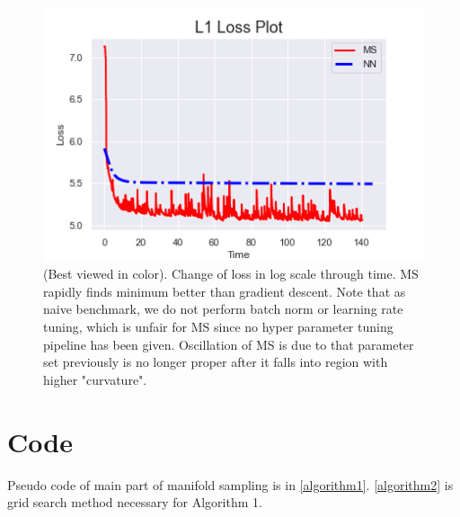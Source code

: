 \documentclass[10pt, oneside]{article}
\begin{document}
  
  \begin{figure}[H]
\centering
  \includegraphics[width=0.8\linewidth]{figure/loss.png}
   \caption{(Best viewed in color). Change of loss in log scale through time. MS rapidly finds minimum better than gradient descent. Note that as naive benchmark, we do not perform batch norm or learning rate tuning, which is unfair for MS since no hyper parameter tuning pipeline has been given. Oscillation of MS is due to that parameter set previously is no longer proper after it falls into region with higher "curvature". }
\label{fig:loss}
\end{figure}






\newpage
\appendix

 \section{Code}
 \label{ap1}
Pseudo code of main part of manifold sampling is in \ref{algorithm1}. \ref{algorithm2} is grid search method necessary for Algorithm 1. 
\end{document}
